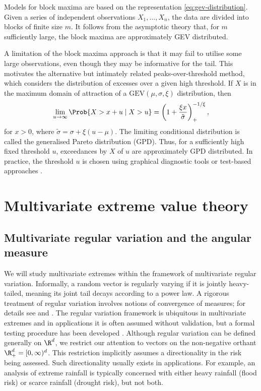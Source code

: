 \documentclass[en-GB, a4paper, nobind]{templates/bathreport}
\begin{document}
Models for block maxima are based on the representation \eqref{eq:gev-distribution}. Given a series of independent observations \(X_1,\ldots,X_n\), the data are divided into blocks of finite size \(m\). It follows from the asymptotic theory that, for \(m\) sufficiently large, the block maxima are approximately GEV distributed.

A limitation of the block maxima approach is that it may fail to utilise some large observations, even though they may be informative for the tail. This motivates the alternative but intimately related peaks-over-threshold method, which considers the distribution of excesses over a given high threshold. If \(X\) is in the maximum domain of attraction of a \(\mathrm{GEV}(\mu,\sigma,\xi)\) distribution, then
\begin{equation}
\lim_{u\to\infty} \Prob{X>x+u \mid X>u} = 
\left(1+\frac{\xi x}{\tilde{\sigma}}\right)_+^{-1/\xi}, 
\label{eq:gpd-distribution}
\end{equation}
for \(x>0\), where \(\tilde{\sigma}=\sigma+\xi(u-\mu)\). The limiting conditional distribution is called the generalised Pareto distribution (GPD). Thus, for a sufficiently high fixed threshold \(u\), exceedances by \(X\) of \(u\) are approximately GPD distributed. In practice, the threshold \(u\) is chosen using graphical diagnostic tools \autocite[Section 4.3.1]{colesIntroductionStatisticalModeling2001} or test-based approaches \autocite{wadsworthExploitingStructureMaximum2016,wadsworthLikelihoodbasedProceduresThreshold2012}.

\hypertarget{multivariate-evt}{%
\section{Multivariate extreme value theory}\label{multivariate-evt}}

\hypertarget{mv-reg-var-angular-measure}{%
\subsection{Multivariate regular variation and the angular measure}\label{mv-reg-var-angular-measure}}

We will study multivariate extremes within the framework of multivariate regular variation. Informally, a random vector is regularly varying if it is jointly heavy-tailed, meaning its joint tail decays according to a power law. A rigorous treatment of regular variation involves notions of convergence of measures; for details see \textcite{resnickExtremeValuesRegular1987} and \textcite{resnickHeavytailPhenomenaProbabilistic2007}. The regular variation framework is ubiquitous in multivariate extremes and in applications it is often assumed without validation, but a formal testing procedure has been developed \autocite{einmahlTestingMultivariateRegular2020}. Although regular variation can be defined generally on \(\R^d\), we restrict our attention to vectors on the non-negative orthant \(\R^d_+=[0,\infty)^d\). This restriction implicitly assumes a directionality in the risk being assessed. Such directionality usually exists in applications. For example, an analysis of extreme rainfall is typically concerned with either heavy rainfall (flood risk) or scarce rainfall (drought risk), but not both.
\end{document}
